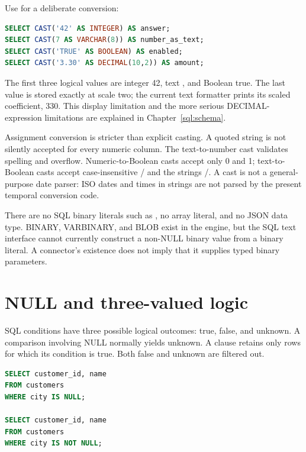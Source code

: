 Use  for a deliberate conversion:

\begin{lstlisting}[language=SQL]
SELECT CAST('42' AS INTEGER) AS answer;
SELECT CAST(7 AS VARCHAR(8)) AS number_as_text;
SELECT CAST('TRUE' AS BOOLEAN) AS enabled;
SELECT CAST('3.30' AS DECIMAL(10,2)) AS amount;
\end{lstlisting}

The first three logical values are integer 42, text , and Boolean true. The last value is stored exactly at scale two; the current text formatter prints its scaled coefficient, 330. This display limitation and the more serious DECIMAL-expression limitations are explained in Chapter~\ref{sql:schema}.

Assignment conversion is stricter than explicit casting. A quoted string is not silently accepted for every numeric column. The text-to-number cast validates spelling and overflow. Numeric-to-Boolean casts accept only 0 and 1; text-to-Boolean casts accept case-insensitive / and the strings /. A cast is not a general-purpose date parser: ISO dates and times in strings are not parsed by the present temporal conversion code.

There are no SQL binary literals such as , no array literal, and no JSON data type. BINARY, VARBINARY, and BLOB exist in the engine, but the SQL text interface cannot currently construct a non-NULL binary value from a binary literal. A connector's existence does not imply that it supplies typed binary parameters.


\section{NULL and three-valued logic}
\label{sql:null}

SQL conditions have three possible logical outcomes: true, false, and unknown. A comparison involving NULL normally yields unknown. A  clause retains only rows for which its condition is true. Both false and unknown are filtered out.

\begin{lstlisting}[language=SQL]
SELECT customer_id, name
FROM customers
WHERE city IS NULL;

SELECT customer_id, name
FROM customers
WHERE city IS NOT NULL;
\end{lstlisting}

